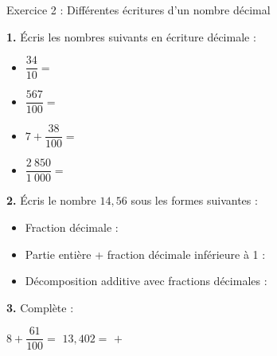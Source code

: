 \smallspace

\begin{exercisebox}{ Exercice 2 : Différentes écritures d'un nombre décimal }

	\textbf{1.} Écris les nombres suivants en écriture décimale : 

	\smallspace

	\begin{itemize}[label=$\bullet$,leftmargin=*,noitemsep]
		\item $\dfrac{34}{10} = $ 
		\item $\dfrac{567}{100} = $ 
		\item $7 + \dfrac{38}{100} = $ 
		\item $\dfrac{2~850}{1~000} = $ 
	\end{itemize}

	\exspace

	\textbf{2.} Écris le nombre $14{,}56$ sous les formes suivantes : 

	\smallspace

	\begin{itemize}[label=$\bullet$,leftmargin=*,noitemsep]
		\item Fraction décimale : 
		\item Partie entière + fraction décimale inférieure à 1 : 
		\item Décomposition additive avec fractions décimales : 
	\end{itemize}

	\exspace

	\textbf{3.} Complète : 

	\smallspace
	
	$8 + \dfrac{61}{100} = $  \qquad $13{,}402 = $  $+$ 


\end{exercisebox}

\smallspace

